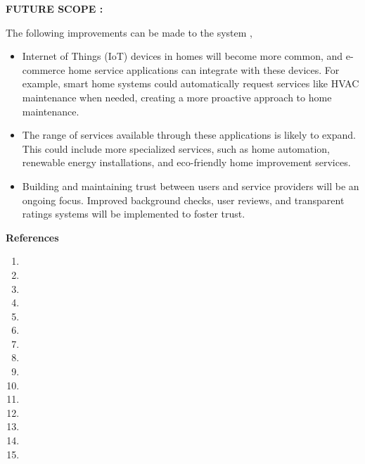 \documentclass[12pt]{article}
\begin{document}
 \large \textbf{FUTURE SCOPE :}\\[3mm]\par
The following improvements can be made to the system ,
\begin{itemize}
\item Internet of Things (IoT) devices in homes will become more common, and e-commerce home service applications can integrate with these devices. For example, smart home systems could automatically request services like HVAC maintenance when needed, creating a more proactive approach to home maintenance.
\item The range of services available through these applications is likely to expand. This could include more specialized services, such as home automation, renewable energy installations, and eco-friendly home improvement services.
\item Building and maintaining trust between users and service providers will be an ongoing focus. Improved background checks, user reviews, and transparent ratings systems will be implemented to foster trust.

\end{itemize}
 

 
\clearpage


\LARGE \textbf{References }\\[5mm]

\begin{enumerate}
\item  
\item 
\item 
\item 
\item  
\item 
\item 
\item 

\clearpage

\item 
\item 
\item 
\item 
\item 
\item 
\item 
\end{enumerate}


 
\end{document}
